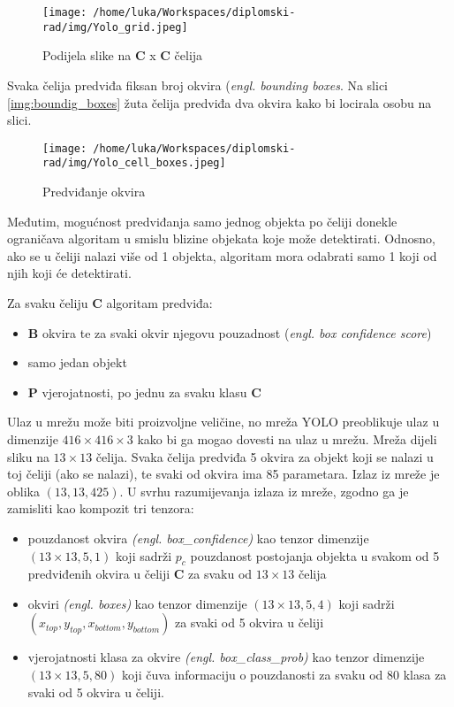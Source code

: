 \begin{figure}[htp]
	\centering
	\texttt{[image: /home/luka/Workspaces/diplomski-rad/img/Yolo\_grid.jpeg]}
	\caption{Podijela slike na \textbf{C} x \textbf{C} čelija}
	\label{img:yolo_grid_cells}
\end{figure}

Svaka čelija predviđa fiksan broj okvira (\textit{engl. bounding boxes}. Na slici \ref{img:boundig_boxes} žuta čelija predviđa dva okvira kako bi locirala osobu na slici. 

\begin{figure}[htp]
\centering
\texttt{[image: /home/luka/Workspaces/diplomski-rad/img/Yolo\_cell\_boxes.jpeg]}
\caption{Predviđanje okvira}
\label{img:bounding_boxes}
\end{figure}

Međutim, mogućnost predviđanja samo jednog objekta po čeliji donekle ograničava algoritam u smislu blizine objekata koje može detektirati. Odnosno, ako se u čeliji nalazi više od 1 objekta, algoritam mora odabrati samo 1 koji od njih koji će detektirati.  

Za svaku čeliju \textbf{C} algoritam predviđa:
\begin{itemize}
	\item \textbf{B} okvira te za svaki okvir njegovu pouzadnost (\textit{engl. box confidence score})
	\item samo jedan objekt
	\item \textbf{P} vjerojatnosti, po jednu za svaku klasu \textbf{C}
\end{itemize}

Ulaz u mrežu može biti proizvoljne veličine, no mreža YOLO preoblikuje ulaz u dimenzije $416\times416\times3$ kako bi ga mogao dovesti na ulaz u mrežu. Mreža dijeli sliku na $13\times13$ čelija. Svaka čelija predviđa 5 okvira za objekt koji se nalazi u toj čeliji (ako se nalazi), te svaki od okvira ima 85 parametara. Izlaz iz mreže je oblika $(13, 13, 425)$. U svrhu razumijevanja izlaza iz mreže, zgodno ga je zamisliti kao kompozit tri tenzora:

\begin{itemize}
	\item pouzdanost okvira \textit{(engl. box\_confidence)} kao tenzor dimenzije $(13\times13, 5, 1)$ koji sadrži $p_c$ pouzdanost postojanja objekta u svakom od 5 predviđenih okvira u čeliji \textbf{C} za svaku od $13\times13$ čelija
	\item okviri \textit{(engl. boxes)} kao tenzor dimenzije $(13\times13, 5, 4)$ koji sadrži $(x_{top}, y_{top}, x_{bottom}, y_{bottom})$ za svaki od 5 okvira u čeliji
	\item vjerojatnosti klasa za okvire \textit{(engl. box\_class\_prob)} kao tenzor dimenzije $(13\times13, 5, 80)$ koji čuva informaciju o pouzdanosti za svaku od 80 klasa za svaki od 5 okvira u čeliji.
\end{itemize}

